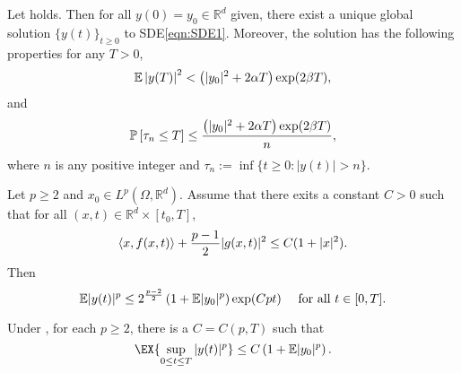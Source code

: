 %
\begin{thm}
	Let  holds. Then for all $y(0)=y_0\in \mathbb{R}^d$ given, there exist a 
	unique global solution $\{y(t)\}_{t\geq 0}$ to SDE\eqref{eqn:SDE1}. Moreover, the solution has the 
	following properties for any $T>0$,
	\begin{equation*}
		\mathbb{E}\left|y(T)\right|^2< 
		\left(
			|y_0|^2 +2\alpha T 
		\right)\exp(2\beta T),
	\end{equation*}
	and
	\begin{equation*}
	\mathbb{P}\left[\tau_n\leq T\right]
	\leq \frac{
		\left(
		|y_0|^2 +2\alpha T 
		\right)
		\exp(2\beta T)
	}{n},
	\end{equation*}
	where $n$ is any positive integer and 
	$\tau_n := \inf \{ t\geq 0 : |y(t)|>n\}$.
\end{thm}
%
\begin{thm}
	\label{thm:MaoCoercive}
	Let $p\geq 2$ and $x_0\in L^p(\Omega, \mathbb{R}^d)$. Assume that there exits a constant $C>0$
	such that for all $(x,t)\in \mathbb{R}^d\times [t_0,T]$,
	\begin{equation*}
	\left\langle x, f(x,t)\right\rangle+\frac{p-1}{2}|g(x,t)|^2 \leq C(1+|x|^2).
	\end{equation*}
	Then
	\begin{equation*}
	\mathbb{E}|y(t)|^p
	\leq
	2^{\frac{p-2}{2}}
	\left(
	1 + \mathbb{E}|y_0|^p
	\right)\exp({Cpt}) \quad \text{ for all } t\in[0,T].
	\end{equation*}
\end{thm}
%
\begin{lem}
	\label{lem:MomentBound}
	Under , for each $p\geq 2$, there is a $C=C(p,T)$ such that
	\begin{equation*}
	\EX{\sup_{0\leq t \leq T}|y(t)|^p}\leq C \left(1+\mep{y_0}\right).
	\end{equation*}
\end{lem}
%